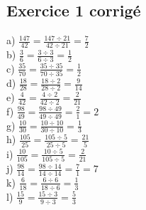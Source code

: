 \documentclass{article}
\begin{document}
\subsection*{Exercice 1 corrigé}
a) $\frac{147}{42}=\frac{147\div21}{42\div21}=\frac{7}{2}$\\ 
\vspace{10 mm}
b) $\frac{3}{6}=\frac{3\div3}{6\div3}=\frac{1}{2}$\\ 
\vspace{10 mm}
c) $\frac{35}{70}=\frac{35\div35}{70\div35}=\frac{1}{2}$\\ 
\vspace{10 mm}
d) $\frac{18}{28}=\frac{18\div2}{28\div2}=\frac{9}{14}$\\ 
\vspace{10 mm}
e) $\frac{4}{42}=\frac{4\div2}{42\div2}=\frac{2}{21}$\\ 
\vspace{10 mm}
f) $\frac{98}{49}=\frac{98\div49}{49\div49}=\frac{2}{1}=2$\\ 
\vspace{10 mm}
g) $\frac{10}{30}=\frac{10\div10}{30\div10}=\frac{1}{3}$\\ 
\vspace{10 mm}
h) $\frac{105}{25}=\frac{105\div5}{25\div5}=\frac{21}{5}$\\ 
\vspace{10 mm}
i) $\frac{10}{105}=\frac{10\div5}{105\div5}=\frac{2}{21}$\\ 
\vspace{10 mm}
j) $\frac{98}{14}=\frac{98\div14}{14\div14}=\frac{7}{1}=7$\\ 
\vspace{10 mm}
k) $\frac{6}{18}=\frac{6\div6}{18\div6}=\frac{1}{3}$\\ 
\vspace{10 mm}
l) $\frac{15}{9}=\frac{15\div3}{9\div3}=\frac{5}{3}$\\ 
\vspace{10 mm}
\newpage
\end{document}
